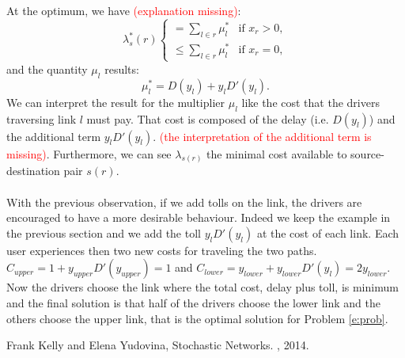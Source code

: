 At the optimum, we have \textcolor{red}{(explanation missing)}:
\begin{equation}
\lambda^*_s(r)
\begin{cases}
= \sum_{l \in r} \mu^*_l & \mbox{if } x_r > 0,\\
\leq \sum_{l \in r} \mu^*_l & \mbox{if } x_r = 0,
\end{cases}
\end{equation}
and the quantity $\mu_l$ results:
\begin{equation}
\mu^*_l = D(y_l)+  y_l D'(y_l).
\end{equation} 
We can interpret the result for the multiplier $\mu_l$ like the cost that the drivers traversing link $l$ must pay. That cost is composed of the delay (i.e. $D(y_l)$) and the additional term $y_l D'(y_l)$. \textcolor{red}{(the interpretation of the additional term is missing)}. Furthermore, we can see $\lambda_{s(r)}$ the minimal cost available to source-destination pair $s(r)$.\\\\
With the previous observation, if we add tolls on the link, the drivers are encouraged to have a more desirable behaviour. Indeed we keep the example in the previous section and we add the toll $y_l D'(y_l)$ at the cost of each link. Each user experiences then two new costs for traveling the two paths. 
 $C_{upper}=1 + y_{upper} D'(y_{upper})= 1$ and   $C_{lower} = y_{lower} + y_{lower} D'(y_l)= 2y_{lower}$. Now the drivers choose the link where the total cost, delay plus toll, is minimum and the final solution is that half of the drivers choose the lower link and the others choose the upper link, that is the optimal solution for Problem \eqref{e:prob}.



\begin{thebibliography}{alpha}

 Frank Kelly and Elena Yudovina,
\newblock Stochastic Networks.
, 2014.

\end{thebibliography}



